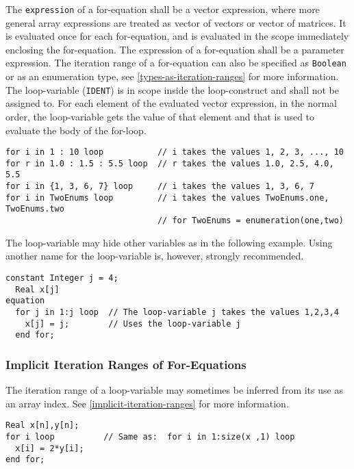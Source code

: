The \lstinline!expression! of a for-equation shall be a vector expression, where more general array expressions are treated as vector of vectors or vector of matrices.  It is evaluated once for each for-equation, and is evaluated in the scope immediately enclosing the for-equation.  The expression of a for-equation shall be a parameter expression.  The iteration range of a for-equation can also be specified as \lstinline!Boolean! or as an enumeration type, see \cref{types-as-iteration-ranges} for more information.  The loop-variable (\lstinline!IDENT!) is in scope inside the loop-construct and shall not be assigned to.  For each element of the evaluated vector expression, in the normal order, the loop-variable gets the value of that element and that is used to evaluate the body of the for-loop.

\begin{example}
\begin{lstlisting}[language=modelica]
for i in 1 : 10 loop           // i takes the values 1, 2, 3, ..., 10
for r in 1.0 : 1.5 : 5.5 loop  // r takes the values 1.0, 2.5, 4.0, 5.5
for i in {1, 3, 6, 7} loop     // i takes the values 1, 3, 6, 7
for i in TwoEnums loop         // i takes the values TwoEnums.one, TwoEnums.two
                               // for TwoEnums = enumeration(one,two)
\end{lstlisting}

The loop-variable may hide other variables as in the following example.  Using another name for the loop-variable is, however, strongly recommended.
\begin{lstlisting}[language=modelica]
  constant Integer j = 4;
  Real x[j]
equation
  for j in 1:j loop  // The loop-variable j takes the values 1,2,3,4
    x[j] = j;        // Uses the loop-variable j
  end for;
\end{lstlisting}
\end{example}


\subsubsection{Implicit Iteration Ranges of For-Equations}\label{implicit-iteration-ranges-of-for-equations}

The iteration range of a loop-variable may sometimes be inferred from its use as an array index.  See \cref{implicit-iteration-ranges} for more information.

\begin{example}
\begin{lstlisting}[language=modelica]
  Real x[n],y[n];
for i loop          // Same as:  for i in 1:size(x ,1) loop
  x[i] = 2*y[i];
end for;
\end{lstlisting}
\end{example}

